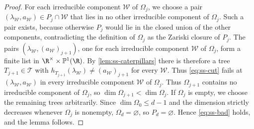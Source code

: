 \begin{proof}
For each irreducible component $\mathcal W$ of $\Omega_j$, we choose a pair
$(\lambda_{\mathcal W},a_{\mathcal W})\in P_j\cap\mathcal W$ that lies in no other irreducible component
of $\Omega_j$.
Such a pair exists, because otherwise $P_j$ would lie in the closed
union of the other components, contradicting the definition of
$\Omega_j$ as the Zariski closure of $P_j$.
The pairs $(\lambda_{\mathcal W},(a_{\mathcal W})_{j+1})$, one for each irreducible component
$\mathcal W$ of $\Omega_j$, form a finite list in
$\R^\times\times\mathbb P^1(\R)$.
By \cref{lem:ss-caterpillars} there is therefore a tree
$T_{j+1}\in\mathcal T$ with
$h_{T_{j+1}}(\lambda_{\mathcal W})\ne(a_{\mathcal W})_{j+1}$ for every $\mathcal W$.
Thus \cref{eq:ss-cut} fails at $(\lambda_{\mathcal W},a_{\mathcal W})$ in every irreducible
component $\mathcal W$ of $\Omega_j$.
Thus $\Omega_{j+1}$ contains no irreducible component of $\Omega_j$,
so $\dim\Omega_{j+1}<\dim\Omega_j$.
If $\Omega_j$ is empty, we choose the remaining trees arbitrarily.
Since $\dim\Omega_0\le d-1$ and the dimension strictly decreases
whenever $\Omega_j$ is nonempty, $\Omega_d=\varnothing$, so $P_d=\varnothing$.
Hence \cref{eq:ss-bad} holds, and the lemma follows.
\end{proof}

